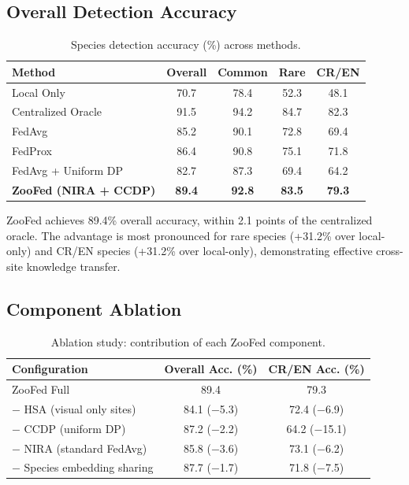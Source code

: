 \documentclass[11pt,a4paper]{article}
\begin{document}
\subsection{Overall Detection Accuracy}

\begin{table}[H]
\centering
\caption{Species detection accuracy (\%) across methods.}
\label{tab:accuracy}
\begin{tabular}{@{}lcccc@{}}
\toprule
\textbf{Method} & \textbf{Overall} & \textbf{Common} & \textbf{Rare} & \textbf{CR/EN} \\
\midrule
Local Only & 70.7 & 78.4 & 52.3 & 48.1 \\
Centralized Oracle & 91.5 & 94.2 & 84.7 & 82.3 \\
FedAvg & 85.2 & 90.1 & 72.8 & 69.4 \\
FedProx & 86.4 & 90.8 & 75.1 & 71.8 \\
FedAvg + Uniform DP & 82.7 & 87.3 & 69.4 & 64.2 \\
\textbf{ZooFed (NIRA + CCDP)} & \textbf{89.4} & \textbf{92.8} & \textbf{83.5} & \textbf{79.3} \\
\bottomrule
\end{tabular}
\end{table}

ZooFed achieves 89.4\% overall accuracy, within 2.1 points of the centralized oracle.
The advantage is most pronounced for rare species (+31.2\% over local-only) and CR/EN species (+31.2\% over local-only), demonstrating effective cross-site knowledge transfer.

\subsection{Component Ablation}

\begin{table}[H]
\centering
\caption{Ablation study: contribution of each ZooFed component.}
\label{tab:ablation}
\begin{tabular}{@{}lcc@{}}
\toprule
\textbf{Configuration} & \textbf{Overall Acc. (\%)} & \textbf{CR/EN Acc. (\%)} \\
\midrule
ZooFed Full & 89.4 & 79.3 \\
$-$ HSA (visual only sites) & 84.1 ($-$5.3) & 72.4 ($-$6.9) \\
$-$ CCDP (uniform DP) & 87.2 ($-$2.2) & 64.2 ($-$15.1) \\
$-$ NIRA (standard FedAvg) & 85.8 ($-$3.6) & 73.1 ($-$6.2) \\
$-$ Species embedding sharing & 87.7 ($-$1.7) & 71.8 ($-$7.5) \\
\bottomrule
\end{tabular}
\end{table}
\end{document}
